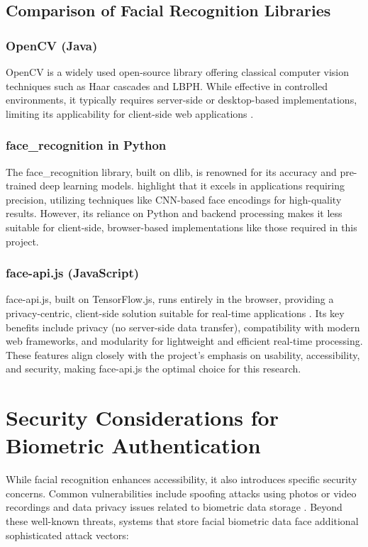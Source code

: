 \clearpage

\subsection{Comparison of Facial Recognition Libraries}

\subsubsection{OpenCV (Java)}
OpenCV is a widely used open-source library offering classical computer vision techniques such as Haar cascades and LBPH. While effective in controlled environments, it typically requires server-side or desktop-based implementations, limiting its applicability for client-side web applications \autocite{Dominguez2017}.

\subsubsection{face\_recognition in Python}  
The face\_recognition library, built on dlib, is renowned for its accuracy and pre-trained deep learning models. \textcite{ZhangDlib2020} highlight that it excels in applications requiring precision, utilizing techniques like CNN-based face encodings for high-quality results. However, its reliance on Python and backend processing makes it less suitable for client-side, browser-based implementations like those required in this project.

\subsubsection{face-api.js (JavaScript)}
face-api.js, built on TensorFlow.js, runs entirely in the browser, providing a privacy-centric, client-side solution suitable for real-time applications \autocite{Vageele2024}. Its key benefits include privacy (no server-side data transfer), compatibility with modern web frameworks, and modularity for lightweight and efficient real-time processing. These features align closely with the project's emphasis on usability, accessibility, and security, making face-api.js the optimal choice for this research.

\section{Security Considerations for Biometric Authentication}
While facial recognition enhances accessibility, it also introduces specific security concerns. Common vulnerabilities include spoofing attacks using photos or video recordings and data privacy issues related to biometric data storage \autocite{Bowyer2006, Bahia2024}. Beyond these well-known threats, systems that store facial biometric data face additional sophisticated attack vectors:

